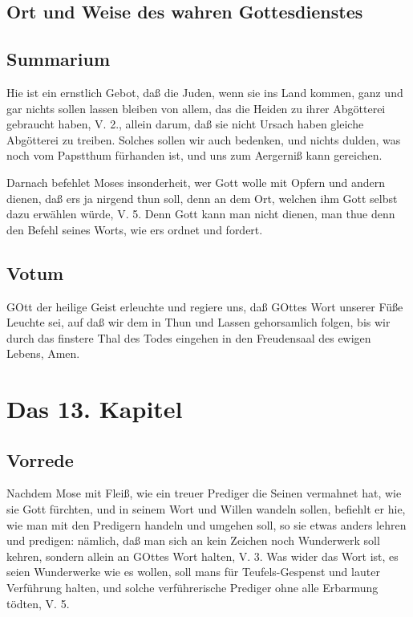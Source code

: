 \section{Ort und Weise des wahren Gottesdienstes}

\section{Summarium}

Hie ist ein ernstlich Gebot, daß die Juden, wenn sie ins Land kommen, ganz und gar nichts sollen lassen bleiben von allem, das die Heiden zu ihrer Abgötterei gebraucht haben, V. 2., allein darum, daß sie nicht Ursach haben gleiche Abgötterei zu treiben. Solches sollen wir auch bedenken, und nichts dulden, was noch vom Papstthum fürhanden ist, und uns zum Aergerniß kann gereichen.

Darnach befehlet Moses insonderheit, wer Gott wolle mit Opfern und andern dienen, daß ers ja nirgend thun soll, denn an dem Ort, welchen ihm Gott selbst dazu erwählen würde, V. 5. Denn Gott kann man nicht dienen, man thue denn den Befehl seines Worts, wie ers ordnet und fordert.

\section{Votum}

GOtt der heilige Geist erleuchte und regiere uns, daß GOttes Wort unserer Füße Leuchte sei, auf daß wir dem in Thun und Lassen gehorsamlich folgen, bis wir durch das finstere Thal des Todes eingehen in den Freudensaal des ewigen Lebens, Amen.

\chapter{Das 13. Kapitel}

\section{Vorrede}

Nachdem Mose mit Fleiß, wie ein treuer Prediger die Seinen vermahnet hat, wie sie Gott fürchten, und in seinem Wort und Willen wandeln sollen, befiehlt er hie, wie man mit den Predigern handeln und umgehen soll, so sie etwas anders lehren und predigen: nämlich, daß man sich an kein Zeichen noch Wunderwerk soll kehren, sondern allein an GOttes Wort halten, V. 3. Was wider das Wort ist, es seien Wunderwerke wie es wollen, soll mans für Teufels-Gespenst und lauter Verführung halten, und solche verführerische Prediger ohne alle Erbarmung tödten, V. 5.

